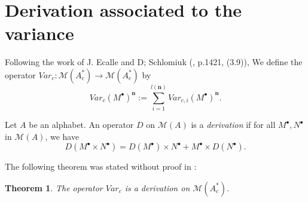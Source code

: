 \documentclass[english,11pt]{amsart}
\newtheorem{theorem}{Theorem}
\def\nn{\mathbf{n}}
\def\M{\mathscr{M}}
\def\di{\displaystyle}
\def\nn{\mathbf{n}}
\begin{document}
\section{Derivation associated to the variance}
\label{derivvar}

Following the work of J. Ecalle and D; Schlomiuk (\cite{es}, p.1421, (3.9)), We define the operator $Var_c :\M (A_c^* ) \rightarrow \M (A_c^* )$ by
\begin{equation}
    Var_c (M^{\bullet} )^{\nn} :=\di\sum_{i=1}^{l(\nn )} Var_{c,i} (M^{\bullet} )^{\nn} .
\end{equation}

Let $A$ be an alphabet. An operator $D$ on $\M (A )$ is a {\it derivation} if for all $M^{\bullet},N^{\bullet}$ in $\M (A)$, we have 
\begin{equation}
    D (M^{\bullet} \times N^{\bullet} ) =D(M^{\bullet} ) \times N^{\bullet} +M^{\bullet} \times D(N^{\bullet} ) .
\end{equation}

The following theorem was stated without proof in \cite{es}:

\begin{theorem}
    The operator $Var_c$ is a derivation on $\M (A_c^* )$.
\end{theorem}
\end{document}
